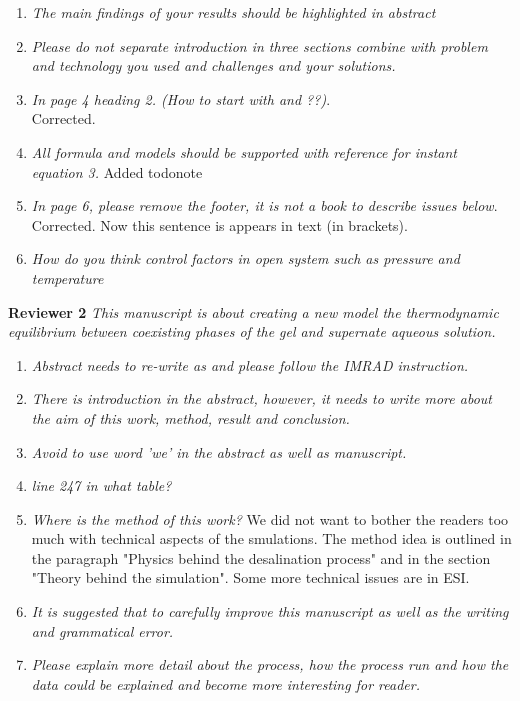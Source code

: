 \documentclass[12pt]{dinbrief}
\begin{document}
\begin{enumerate}
\item \textit{The main findings of your results should be highlighted in abstract} 

\item \textit{Please do not separate introduction in three sections combine with problem and technology you used and challenges and your solutions.}

\item \textit{In page 4 heading 2. (How to start with and ??)}.\\
Corrected.

\item \textit{All formula and models should be supported with reference for instant equation 3.}
Added todonote

\item \textit{In page 6, please remove the footer, it is not a book to describe issues below}.\\
Corrected. Now this sentence is appears in text (in brackets).


\item \textit{How do you think control factors in open system such as pressure and temperature}

\end{enumerate}


\textbf{Reviewer 2}
\textit{This manuscript is about creating a new model the thermodynamic equilibrium between coexisting phases of the gel and supernate aqueous solution.}
\begin{enumerate}

\item \textit{Abstract needs to re-write as and please follow the IMRAD instruction.}
\item \textit{There is introduction in the abstract, however, it needs to write more about the aim of this work, method, result and conclusion.}
\item \textit{Avoid to use word 'we' in the abstract as well as manuscript.}
\item \textit{line 247 in what table?}
\item \textit{Where is the method of this work?}
We did not want to bother the readers too much with technical aspects of the smulations. 
The method idea is outlined in the paragraph "Physics behind the desalination process" and in the section "Theory behind the simulation". Some more technical issues are in ESI.
\item \textit{It is suggested that to carefully improve this manuscript as well as the writing and grammatical error.}
\item \textit{Please explain more detail about the process, how the process run and how the data could be explained and become more interesting for reader.}

\end{enumerate}
\end{document}
